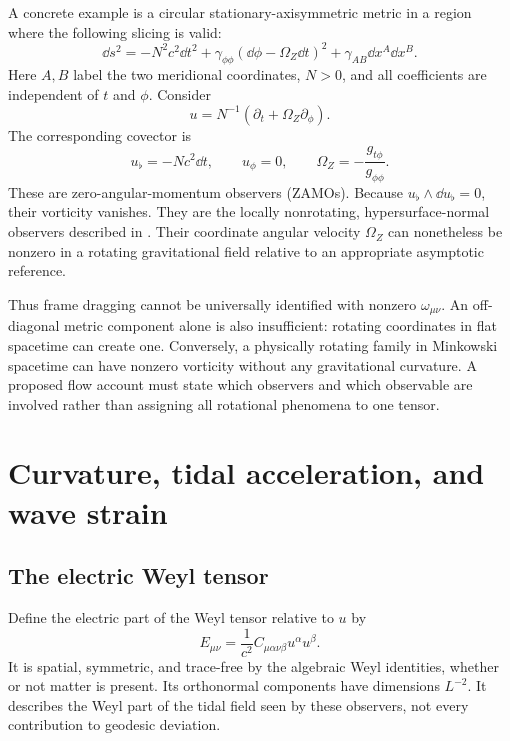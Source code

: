 \documentclass[11pt]{article}
\begin{document}
A concrete example is a circular stationary-axisymmetric metric in a region where the following slicing is valid:
\begin{equation}
\dd s^2=-N^2c^2\dd t^2+
\gamma_{\phi\phi}(\dd\phi-\Omega_Z\dd t)^2+
\gamma_{AB}\dd x^A\dd x^B.
\end{equation}
Here $A,B$ label the two meridional coordinates, $N>0$, and all coefficients are independent of $t$ and $\phi$. Consider
\begin{equation}
u=N^{-1}(\partial_t+\Omega_Z\partial_\phi).
\end{equation}
The corresponding covector is
\begin{equation}
u_\flat=-Nc^2\dd t,
\qquad u_\phi=0,
\qquad \Omega_Z=-\frac{g_{t\phi}}{g_{\phi\phi}}.
\end{equation}
These are zero-angular-momentum observers (ZAMOs). Because
$u_\flat\wedge\dd u_\flat=0$, their vorticity vanishes. They are the locally nonrotating, hypersurface-normal observers described in \textcite{Gourgoulhon2010}. Their coordinate angular velocity $\Omega_Z$ can nonetheless be nonzero in a rotating gravitational field relative to an appropriate asymptotic reference.

Thus frame dragging cannot be universally identified with nonzero $\omega_{\mu\nu}$. An off-diagonal metric component alone is also insufficient: rotating coordinates in flat spacetime can create one. Conversely, a physically rotating family in Minkowski spacetime can have nonzero vorticity without any gravitational curvature. A proposed flow account must state which observers and which observable are involved rather than assigning all rotational phenomena to one tensor.

\section{Curvature, tidal acceleration, and wave strain}
\subsection{The electric Weyl tensor}
Define the electric part of the Weyl tensor relative to $u$ by
\begin{equation}
E_{\mu\nu}=\frac{1}{c^2}C_{\mu\alpha\nu\beta}u^\alpha u^\beta.
\label{eq:weylelectric}
\end{equation}
It is spatial, symmetric, and trace-free by the algebraic Weyl identities, whether or not matter is present. Its orthonormal components have dimensions $L^{-2}$. It describes the Weyl part of the tidal field seen by these observers, not every contribution to geodesic deviation.
\end{document}
